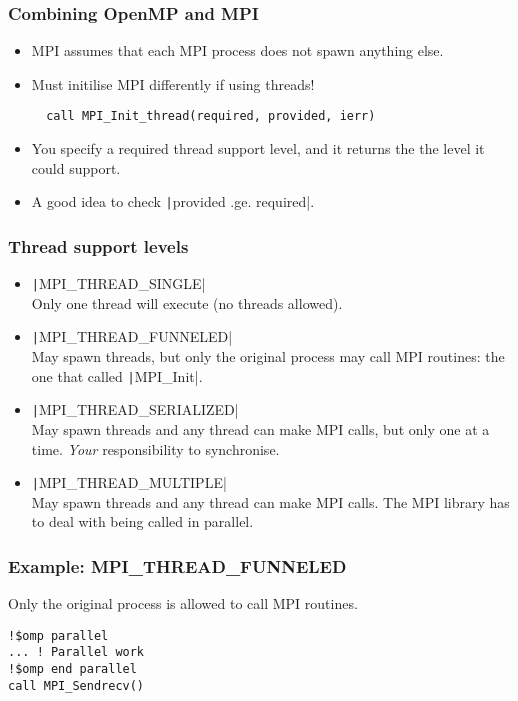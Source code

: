 \documentclass{beamer}
\begin{document}
\begin{frame}[fragile]
\frametitle{Combining OpenMP and MPI}
\begin{itemize}
  \item MPI assumes that each MPI process does not spawn anything else.
  \item Must initilise MPI differently if using threads!
  \begin{verbatim}
  call MPI_Init_thread(required, provided, ierr)
  \end{verbatim}

  \item You specify a required thread support level, and it returns the the level it could support.
  \item A good idea to check \texttt|provided .ge. required|.
\end{itemize}
\end{frame}

\begin{frame}
\frametitle{Thread support levels}
\begin{itemize}
  \item \texttt|MPI_THREAD_SINGLE| \\
  Only one thread will execute (no threads allowed).

  \item \texttt|MPI_THREAD_FUNNELED| \\
  May spawn threads, but only the original process may call MPI routines: the one that called \texttt|MPI_Init|.

  \item \texttt|MPI_THREAD_SERIALIZED| \\
  May spawn threads and any thread can make MPI calls, but only one at a time. \emph{Your} responsibility to synchronise.

  \item \texttt|MPI_THREAD_MULTIPLE| \\
  May spawn threads and any thread can make MPI calls. The MPI library has to deal with being called in parallel.
\end{itemize}

\end{frame}

\begin{frame}[fragile]
\frametitle{Example: MPI\_THREAD\_FUNNELED}
Only the original process is allowed to call MPI routines.
\begin{verbatim}
!$omp parallel
... ! Parallel work
!$omp end parallel
call MPI_Sendrecv()
\end{verbatim}
\end{frame}
\end{document}
